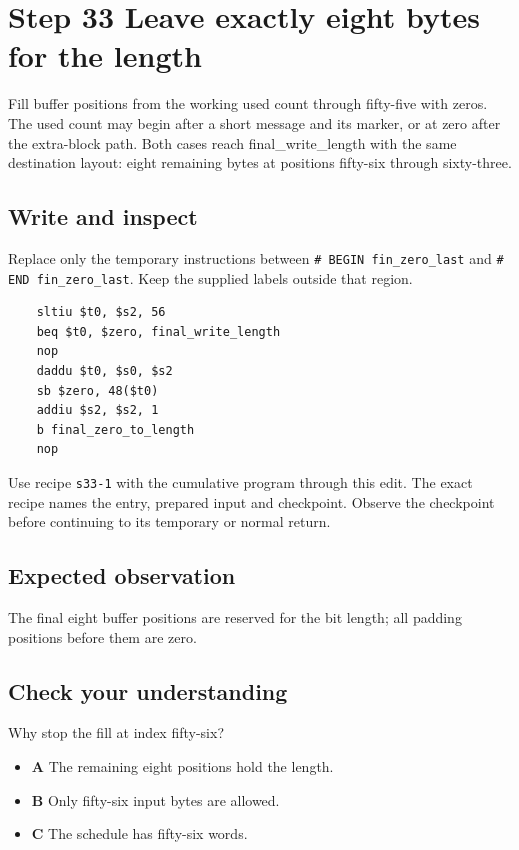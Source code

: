 \section{Step 33 Leave exactly eight bytes for the length}\label{sha-s33}

Fill buffer positions from the working used count through fifty-five with zeros. The used count may begin after a short message and its marker, or at zero after the extra-block path. Both cases reach final\_write\_length with the same destination layout: eight remaining bytes at positions fifty-six through sixty-three.

\subsection{Write and inspect}
Replace only the temporary instructions between \texttt{\# BEGIN fin\_zero\_last} and \texttt{\# END fin\_zero\_last}. Keep the supplied labels outside that region.

\begin{verbatim}
    sltiu $t0, $s2, 56
    beq $t0, $zero, final_write_length
    nop
    daddu $t0, $s0, $s2
    sb $zero, 48($t0)
    addiu $s2, $s2, 1
    b final_zero_to_length
    nop
\end{verbatim}

Use recipe \texttt{s33-1} with the cumulative program through this edit. The exact recipe names the entry, prepared input and checkpoint. Observe the checkpoint before continuing to its temporary or normal return.

\subsection{Expected observation}
The final eight buffer positions are reserved for the bit length; all padding positions before them are zero.

\subsection{Check your understanding}
Why stop the fill at index fifty-six?

\begin{itemize}
  \item \textbf{A} The remaining eight positions hold the length.
  \item \textbf{B} Only fifty-six input bytes are allowed.
  \item \textbf{C} The schedule has fifty-six words.
\end{itemize}
